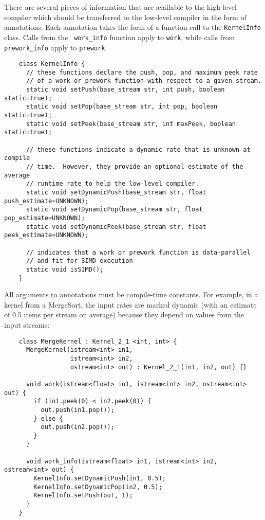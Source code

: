 There are several pieces of information that are available to the
high-level compiler which should be transferred to the low-level
compiler in the form of annotations.  Each annotation takes the form
of a function call to the {\tt KernelInfo} class.  Calls from the {\tt
work\_info} function apply to {\tt work}, while calls from {\tt
prework\_info} apply to {\tt prework}.
{\small
\begin{verbatim}
    class KernelInfo {
      // these functions declare the push, pop, and maximum peek rate
      // of a work or prework function with respect to a given stream.
      static void setPush(base_stream str, int push, boolean static=true);
      static void setPop(base_stream str, int pop, boolean static=true);
      static void setPeek(base_stream str, int maxPeek, boolean static=true);

      // these functions indicate a dynamic rate that is unknown at compile
      // time.  However, they provide an optional estimate of the average
      // runtime rate to help the low-level compiler.
      static void setDynamicPush(base_stream str, float push_estimate=UNKNOWN);
      static void setDynamicPop(base_stream str, float pop_estimate=UNKNOWN);
      static void setDynamicPeek(base_stream str, float peek_estimate=UNKNOWN);

      // indicates that a work or prework function is data-parallel 
      // and fit for SIMD execution
      static void isSIMD();
    }  
\end{verbatim}}

All arguments to annotations must be compile-time constants.  For
example, in a kernel from a MergeSort, the input rates are marked
dynamic (with an estimate of 0.5 items per stream on average) because
they depend on values from the input streams:
{\small
\begin{verbatim}
    class MergeKernel : Kernel_2_1 <int, int> {
      MergeKernel(istream<int> in1, 
                  istream<int> in2, 
                  ostream<int> out) : Kernel_2_1(in1, in2, out) {}

      void work(istream<float> in1, istream<int> in2, ostream<int> out) {
        if (in1.peek(0) < in2.peek(0)) {
          out.push(in1.pop());
        } else {
          out.push(in2.pop());
        }
      }

      void work_info(istream<float> in1, istream<int> in2, ostream<int> out) {
        KernelInfo.setDynamicPush(in1, 0.5);
        KernelInfo.setDynamicPop(in2, 0.5);
        KernelInfo.setPush(out, 1);
      }
    }  
\end{verbatim}}

